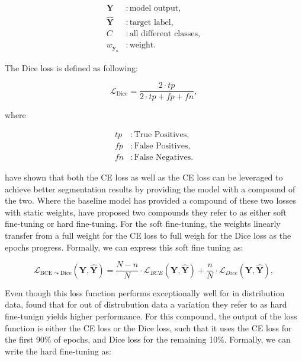 \documentclass[12pt]{article}
\newcommand{\curly}{\mathrel{\leadsto}}
\begin{document}
\begin{align*}
    \mathbf{Y}          &: \text{model output}, \\
    \hat{\mathbf{Y}}    &: \text{target label}, \\
    C                   &: \text{all different classes}, \\
    w_{\mathbf{y}_n}    &: \text{weight}.
\end{align*}

The Dice loss is defined as following:

\begin{equation}
\mathcal{L}_{\mathrm{Dice}} = \frac{2 \cdot tp}{2 \cdot tp + fp + fn},
\end{equation}

where

\begin{align*}
    tp          &: \text{True Positives}, \\
    fp          &: \text{False Positives}, \\
    fn          &: \text{False Negatives}.
\end{align*}

\citeauthor{customloss} have shown that both the CE loss as well as the CE loss can be leveraged to achieve better segmentation
results by providing the model with a compound of the two. Where the baseline model has provided a compound of these two losses
with static weights, \citeauthor{customloss} have proposed two compounds they refer to as either soft fine-tuning or hard fine-tuning.
For the soft fine-tuning, the weights linearly transfer from a full weight for the CE loss to full weigh for the Dice loss as the 
epochs progress. Formally, we can express this soft fine tuning as:

\begin{equation}
\mathcal{L}_{\mathrm{BCE \curly Dice}}(\mathbf{Y}, \hat{\mathbf{Y}}) = \frac{N-n}{N} \cdot \mathcal{L}_{BCE}(\mathbf{Y}, \hat{\mathbf{Y}}) + \frac{n}{N} \cdot \mathcal{L}_{Dice}(\mathbf{Y}, \hat{\mathbf{Y}}),
\end{equation}

Even though this loss function performs exceptionally well for in distribution data, \citeauthor{customloss} found that for
out of distrubution data a variation they refer to as hard fine-tunign yields higher performance. For this compound, the
output of the loss function is either the CE loss or the Dice loss, such that it uses the CE loss for the first 90\% of epochs,
and Dice loss for the remaining 10\%. Formally, we can write the hard fine-tuning as:
\end{document}
